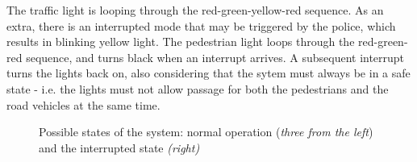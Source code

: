 The traffic light is looping through the red-green-yellow-red sequence. As an extra, there is an interrupted mode that may be triggered by the police, which results in blinking yellow light. The pedestrian light loops through the red-green-red sequence, and turns black when an interrupt arrives. A subsequent interrupt turns the lights back on, also considering that the sytem must always be in a safe state - i.e. the lights must not allow passage for both the pedestrians and the road vehicles at the same time.

\begin{figure}[!ht] 
	\centering
	\caption{Possible states of the system: normal operation (\textit{three from the left}) and the interrupted state \textit{(right)}} 
	\label{fig_casestudy_systemstates}
\end{figure}

